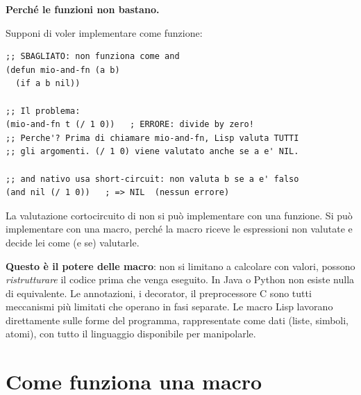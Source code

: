 \begin{tcolorbox}[
  enhanced,
  colback=black!2, colframe=black!20,
  arc=3pt, boxrule=0.4pt,
  left=12pt, right=12pt, top=9pt, bottom=9pt,
  before skip=8pt, after skip=10pt
]
\small\color{black!65}

\textbf{Perché le funzioni non bastano.}

\medskip
Supponi di voler implementare  come funzione:

\begin{tcolorbox}[enhanced, colback=clBg, colframe=gray!40,
  arc=2pt, boxrule=0.4pt, left=8pt, right=6pt, top=4pt, bottom=4pt,
  before skip=4pt, after skip=4pt]
\begin{lstlisting}
;; SBAGLIATO: non funziona come and
(defun mio-and-fn (a b)
  (if a b nil))

;; Il problema:
(mio-and-fn t (/ 1 0))   ; ERRORE: divide by zero!
;; Perche'? Prima di chiamare mio-and-fn, Lisp valuta TUTTI
;; gli argomenti. (/ 1 0) viene valutato anche se a e' NIL.

;; and nativo usa short-circuit: non valuta b se a e' falso
(and nil (/ 1 0))   ; => NIL  (nessun errore)
\end{lstlisting}
\end{tcolorbox}

\medskip
La valutazione cortocircuito di  non si può implementare
con una funzione. Si può implementare con una macro, perché la macro
riceve le espressioni non valutate e decide lei come (e se) valutarle.

\medskip
\textbf{Questo è il potere delle macro}: non si limitano a calcolare
con valori, possono \emph{ristrutturare} il codice prima
che venga eseguito.
In Java o Python non esiste nulla di equivalente.
Le annotazioni, i decorator, il preprocessore C sono tutti
meccanismi più limitati che operano in fasi separate.
Le macro Lisp lavorano direttamente sulle forme del programma,
rappresentate come dati (liste, simboli, atomi), con tutto il
linguaggio disponibile per manipolarle.
\end{tcolorbox}

\section{Come funziona una macro}

